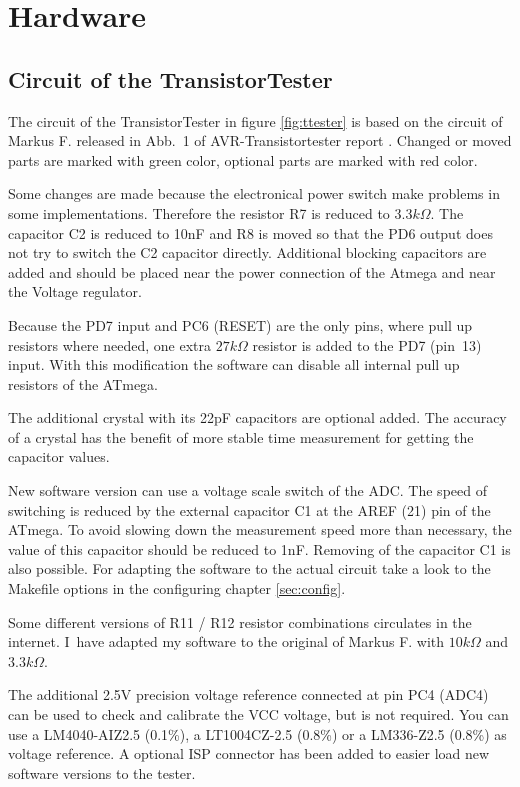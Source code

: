 \chapter{Hardware}

\section{Circuit of the TransistorTester}
\label{sec:hardware}
The circuit of the TransistorTester in figure \ref{fig:ttester} is based on the circuit of
 Markus F. released in Abb.~1 of AVR-Transistortester report \cite{Frejek}.
Changed or moved parts are marked with green color, optional parts are marked with red color.

Some changes are made because the electronical power switch make problems in some implementations.
Therefore the resistor R7 is reduced to \(3.3k\Omega\). The capacitor C2 is reduced to
10nF and R8 is moved so that the PD6 output does not try to switch the C2 capacitor directly.
 Additional blocking capacitors are added and should be placed
near the power connection of the Atmega and near the Voltage regulator.

Because the PD7 input and PC6 (RESET) are the only pins, where pull up resistors where
needed, one extra \(27k\Omega\) resistor is added to the PD7 (pin~13) input. With this modification
the software can disable all internal pull up resistors of the ATmega.

The additional crystal with its 22pF capacitors are optional added. 
The accuracy of a crystal has the benefit of more stable time measurement for getting the
capacitor values.

New software version can use a voltage scale switch of the ADC. The speed of switching is reduced
by the external capacitor C1 at the AREF (21) pin of the ATmega. To avoid slowing down the
measurement speed more than necessary, the value of this capacitor should be reduced to 1nF.
Removing of the capacitor C1 is also possible.
For adapting the software to the actual circuit take a look to the Makefile options in the
configuring chapter \ref{sec:config}.

Some different versions of R11 / R12 resistor combinations circulates
in the internet. I~have adapted my software to the original of Markus F. \cite{Frejek} with \(10k\Omega\) and \(3.3k\Omega\).

The additional 2.5V precision voltage reference connected at pin PC4 (ADC4) can be used to
check and calibrate the VCC voltage, but is not required. You can use a LM4040-AIZ2.5 (0.1\%),
a LT1004CZ-2.5 (0.8\%) or a LM336-Z2.5 (0.8\%) as voltage reference.
A optional ISP connector has been added to easier load new software versions to the tester.

